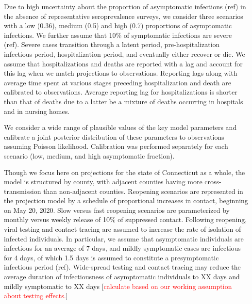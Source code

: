 \documentclass[11pt]{article}
\newcommand{\comment}[1]{[\textcolor{red}{#1}]}
\begin{document}
Due to high uncertainty about the proportion of asymptomatic infections (ref) in the absence of representative seroprevalence surveys, we consider three scenarios with a low (0.36), medium (0.5) and high (0.7) proportions of asymptomatic infections. We further assume that 10\% of symptomatic infections are severe (ref). Severe cases transition through a latent period, pre-hospitalization infectious period, hospitalization period, and eventually either recover or die. We assume that hospitalizations and deaths are reported with a lag and account for this lag when we match projections to observations. Reporting lags along with average time spent at various stages preceding hospitalization and death are calibrated to observations. Average reporting lag for hospitalizations is shorter than that of deaths due to a latter be a mixture of deaths occurring in hospitals and in nursing homes.  

We consider a wide range of plausible values of the key model parameters and calibrate a joint posterior distribution of these parameters to observations assuming Poisson likelihood. Calibration was performed separately for each scenario (low, medium, and high asymptomatic fraction).

Though we focus here on projections for the state of Connecticut as a whole, the model is structured by county, with adjacent counties having more cross-transmission than non-adjacent counties.  Reopening scenarios are represented in the projection model by a schedule of proportional increases in contact, beginning on May 20, 2020. Slow versus fast reopening scenarios are parameterized by monthly versus weekly release of 10\% of suppressed contact. 
Following reopening, viral testing and contact tracing are assumed to increase the rate of isolation of infected individuals. In particular, we assume that asymptomatic individuals are infectious for an average of 7 days, and mildly symptomatic cases are infectious for 4 days, of which 1.5 days is assumed to constitute a presymptomatic infectious period (ref). Wide-spread testing and contact tracing may reduce the average duration of infectiousness of asymptomatic individuals to XX days and mildly symptomatic to XX days \comment{calculate based on our working assumption about testing effects.}

\end{document}
